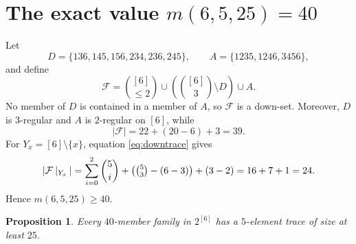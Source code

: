 \documentclass[11pt]{amsart}
\newtheorem{proposition}[theorem]{Proposition}
\newcommand{\tr}{\mathbin{|}}
\newcommand{\cF}{\mathcal F}
\begin{document}
\section{The exact value
\texorpdfstring{$m(6,5,25)=40$}{m(6,5,25)=40}}

Let
\[
  D=\{136,145,156,234,236,245\},\qquad
  A=\{1235,1246,3456\},
\]
and define
\begin{equation}\label{eq:F6}
  \cF=\binom{[6]}{\le2}
  \cup\left(\binom{[6]}3\setminus D\right)\cup A.
\end{equation}
No member of $D$ is contained in a member of $A$, so $\cF$ is a
down-set. Moreover, $D$ is $3$-regular and $A$ is $2$-regular on
$[6]$, while
\[
  |\cF|=22+(20-6)+3=39.
\]
For $Y_x=[6]\setminus\{x\}$, equation \eqref{eq:downtrace} gives
\[
  |\cF\tr_{Y_x}|
  =\sum_{i=0}^{2}\binom5i+\bigl(\tbinom53-(6-3)\bigr)+(3-2)
  =16+7+1=24.
\]
Hence $m(6,5,25)\ge40$.

\begin{proposition}\label{prop:upper}
Every $40$-member family in $2^{[6]}$ has a $5$-element trace of size
at least $25$.
\end{proposition}
\end{document}

